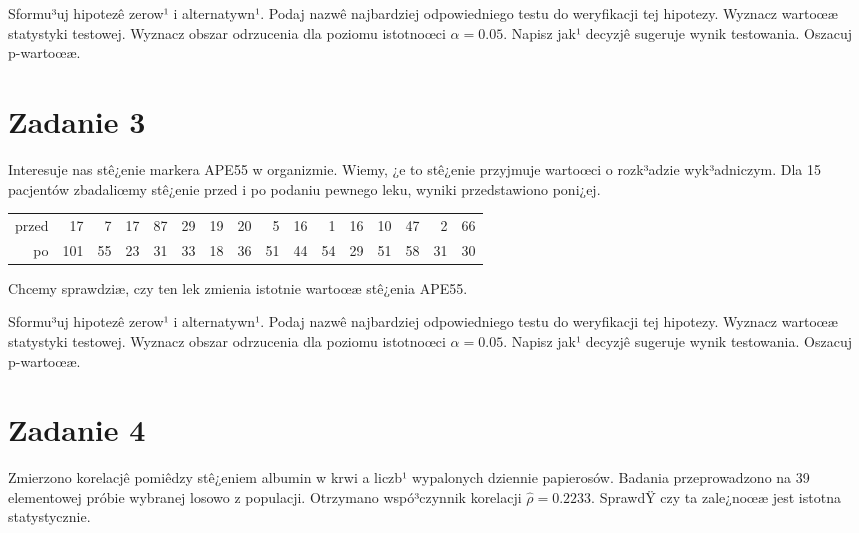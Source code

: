 \documentclass[a4paper,12pt]{article}
\begin{document}
  Sformu³uj hipotezê zerow¹ i alternatywn¹. 
  Podaj nazwê najbardziej odpowiedniego testu do weryfikacji tej hipotezy. 
  Wyznacz wartoœæ statystyki testowej. 
  Wyznacz obszar odrzucenia dla poziomu istotnoœci $\alpha=0.05$. 
  Napisz jak¹ decyzjê sugeruje wynik testowania. Oszacuj p-wartoœæ. \vspace{1cm} 

  \section*{Zadanie 3}
     
  Interesuje nas stê¿enie markera APE55  w organizmie. 
  Wiemy, ¿e to stê¿enie przyjmuje wartoœci o rozk³adzie wyk³adniczym. 
  Dla 15 pacjentów zbadaliœmy stê¿enie przed i po podaniu pewnego leku, 
  wyniki przedstawiono poni¿ej.
  
  \vspace{0.5cm} 
  \noindent\begin{center} 
\begin{tabular}{rrrrrrrrrrrrrrrr}
  \hline
  \hline
przed & 17 & 7 & 17 & 87 & 29 & 19 & 20 & 5 & 16 & 1 & 16 & 10 & 47 & 2 & 66 \\
  po & 101 & 55 & 23 & 31 & 33 & 18 & 36 & 51 & 44 & 54 & 29 & 51 & 58 & 31 & 30 \\
   \hline
\end{tabular}
 
  \end{center} 
  \vspace{0.5cm}
  
  Chcemy sprawdziæ, czy ten lek zmienia istotnie wartoœæ stê¿enia APE55.
  
  Sformu³uj hipotezê zerow¹ i alternatywn¹. 
  Podaj nazwê najbardziej odpowiedniego testu do weryfikacji tej hipotezy. 
  Wyznacz wartoœæ statystyki testowej. 
  Wyznacz obszar odrzucenia dla poziomu istotnoœci $\alpha=0.05$. 
  Napisz jak¹ decyzjê sugeruje wynik testowania. Oszacuj p-wartoœæ. \vspace{1cm} 

  \section*{Zadanie 4}
     
     Zmierzono korelacjê pomiêdzy stê¿eniem albumin w krwi a liczb¹ wypalonych dziennie papierosów. 
     Badania przeprowadzono na 39 elementowej próbie wybranej losowo z populacji. 
     Otrzymano wspó³czynnik korelacji $\hat\rho = 0.2233 $. 
     SprawdŸ czy ta zale¿noœæ jest istotna statystycznie. 
     
\end{document}
